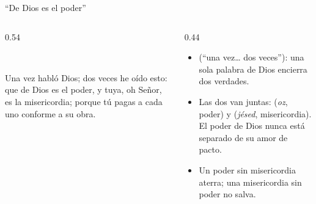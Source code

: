 \begin{frame}{``De Dios es el poder''}
\begin{columns}[c,onlytextwidth]
\begin{column}{0.54\textwidth}
\begin{center}\small{}\\[1pt]\end{center}
\begin{cita}Una vez habló Dios; dos veces he oído esto: que de Dios es el poder, y tuya, oh Señor, es la misericordia; porque tú pagas a cada uno conforme a su obra.\end{cita}
\end{column}
\begin{column}{0.44\textwidth}\small
\begin{itemize}
\item {} (``una vez\ldots{} dos veces''): una sola palabra de Dios encierra dos verdades.
\item Las dos van juntas:  (\emph{oz}, poder) y  (\emph{jésed}, misericordia). El poder de Dios nunca está separado de su amor de pacto.
\item Un poder sin misericordia aterra; una misericordia sin poder no salva.
\end{itemize}
\end{column}
\end{columns}
\end{frame}

